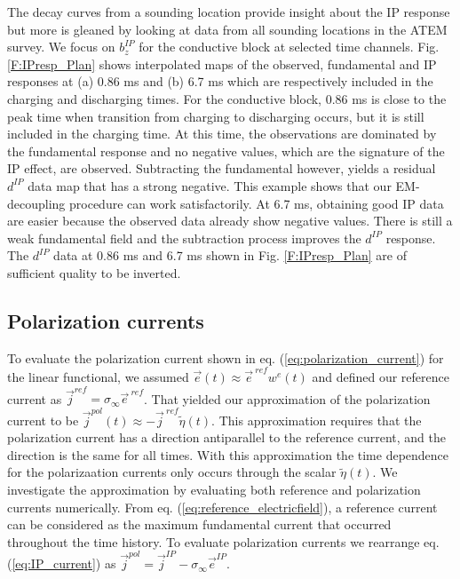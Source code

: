 \documentclass[extra,mreferee]{gji}
\newcommand{\siginf}{\sigma_\infty}
\renewcommand {\j}  { {\vec j} }
\newcommand {\e}  { {\vec e} }
\newcommand{\peta}{\tilde{\eta}}
\newcommand{\eref}{\e^{\ ref}}
\newcommand{\dip}{d^{IP}}
\begin{document}
The decay curves from a sounding location  provide insight about the IP response but more is gleaned by looking at data from all  sounding locations in the ATEM survey. We focus on $b_z^{IP}$ for the conductive block at selected time channels. Fig. \ref{F:IPresp_Plan} shows interpolated maps of the observed, fundamental and IP responses at (a) 0.86 ms and (b) 6.7 ms which are respectively included in the charging and discharging times. For the conductive block, 0.86 ms is close to the peak time when transition from charging to discharging occurs, but it is still included in the charging time.
At this time, the observations are dominated by the fundamental response and no negative values,  which are the signature of the IP effect, are observed. Subtracting the fundamental however, yields a residual $\dip$ data map that has a strong negative. This  example  shows that our EM-decoupling procedure can  work satisfactorily.  At 6.7 ms, obtaining good IP data are easier because the observed data already show negative values. There is still a weak fundamental field and the subtraction process improves the $\dip$ response. The $\dip$ data at  0.86 ms and 6.7 ms shown in Fig. \ref{F:IPresp_Plan} are of sufficient quality to be inverted.



\subsection{Polarization currents}
To evaluate the polarization current shown in eq. (\ref{eq:polarization_current}) for the linear functional, we assumed $\e(t) \approx \eref w^e(t)$ and defined our reference current as $\j^{ref}=\siginf \eref$. That yielded our approximation of the polarization current to be $\j^{pol}(t) \approx -\j^{\ ref} \peta(t)$. This approximation requires that the polarization current has a  direction antiparallel to the reference current, and the direction is the same for all times. With this approximation the time dependence for the polarizaation currents only occurs through the scalar $\peta(t)$. We investigate the approximation by evaluating both reference and polarization currents numerically.
From eq. (\ref{eq:reference_electricfield}), a reference current can be considered as the maximum fundamental current that occurred throughout the  time history.
To evaluate polarization currents we rearrange eq. (\ref{eq:IP_current}) as $\j^{pol} = \j^{IP} - \siginf\e^{IP}$.
\end{document}
